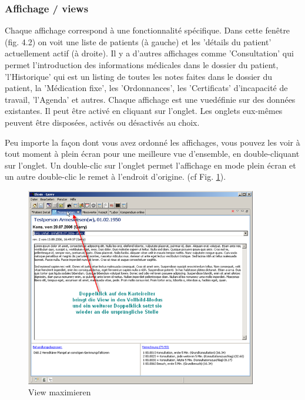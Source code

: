 \subsubsection{Affichage / views}
Chaque affichage correspond à une fonctionnalité spécifique. Dans cette fenêtre (fig. 4.2)
on voit une liste de patients (à gauche) et les 'détails du patient' actuellement actif (à droite).
Il y a d'autres affichages comme 'Consultation' qui permet l'introduction des informations médicales dans le dossier du patient, 'l'Historique' qui est un listing de toutes les notes faites dans le dossier du patient, la 'Médication fixe', les 'Ordonnances', les 'Certificats' d'incapacité de travail, 'l'Agenda' et autres.
Chaque affichage est une  \glqq vue\grqq définie sur des données existantes. Il peut être activé en cliquant sur l'onglet.  Les onglets eux-mêmes peuvent être disposées, activés ou désactivés au choix.

Peu importe la façon dont vous avez ordonné les affichages, vous pouvez les voir à tout moment à plein écran pour une meilleure vue d'ensemble, en double-cliquant sur l'onglet. Un double-clic sur l'onglet permet l'affichage en mode plein écran et un autre double-clic le remet à l'endroit d'origine.
(cf Fig. \ref{fig:tour3}).

\begin{figure}[htp]
\begin{center}
  \includegraphics[width=0.9\textwidth]{images/tour3}
  \caption{View maximieren}
  \label{fig:tour3}
\end{center}
\end{figure}

